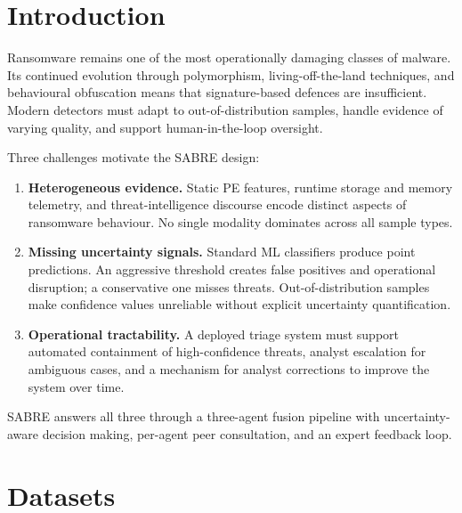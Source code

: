 \documentclass[12pt,a4paper]{article}
\begin{document}
\tableofcontents
\newpage

\section{Introduction}
\label{sec:intro}

Ransomware remains one of the most operationally damaging classes of malware.
Its continued evolution through polymorphism, living-off-the-land techniques, and
behavioural obfuscation means that signature-based defences are insufficient. Modern
detectors must adapt to out-of-distribution samples, handle evidence of varying quality,
and support human-in-the-loop oversight.

Three challenges motivate the SABRE design:

\begin{enumerate}[leftmargin=2em]
  \item \textbf{Heterogeneous evidence.} Static PE features, runtime storage and memory
    telemetry, and threat-intelligence discourse encode distinct aspects of ransomware
    behaviour. No single modality dominates across all sample types.

  \item \textbf{Missing uncertainty signals.} Standard ML classifiers produce point
    predictions. An aggressive threshold creates false positives and operational
    disruption; a conservative one misses threats. Out-of-distribution samples make
    confidence values unreliable without explicit uncertainty quantification.

  \item \textbf{Operational tractability.} A deployed triage system must support
    automated containment of high-confidence threats, analyst escalation for ambiguous
    cases, and a mechanism for analyst corrections to improve the system over time.
\end{enumerate}

SABRE answers all three through a three-agent fusion pipeline with
uncertainty-aware decision making, per-agent peer consultation, and an expert
feedback loop.

\section{Datasets}
\label{sec:data}
\end{document}
